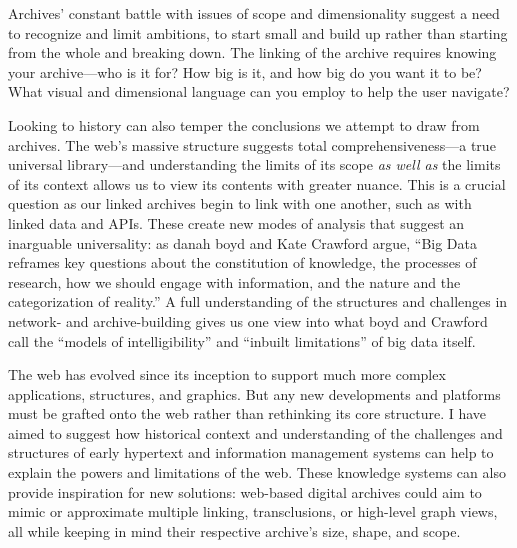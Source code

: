 Archives' constant battle with issues of scope and dimensionality suggest a need to recognize and limit ambitions, to start small and build up rather than starting from the whole and breaking down. The linking of the archive requires knowing your archive---who is it for? How big is it, and how big do you want it to be? What visual and dimensional language can you employ to help the user navigate?

Looking to history can also temper the conclusions we attempt to draw from archives. The web's massive structure suggests total comprehensiveness---a true universal library---and understanding the limits of its scope \emph{as well as} the limits of its context allows us to view its contents with greater nuance. This is a crucial question as our linked archives begin to link with one another, such as with linked data and APIs. These create new modes of analysis that suggest an inarguable universality: as danah boyd and Kate Crawford argue, ``Big Data reframes key questions about the constitution of knowledge, the processes of research, how we should engage with information, and the nature and the categorization of reality.''\autocite{boyd_critical_2012} A full understanding of the structures and challenges in network- and archive-building gives us one view into what boyd and Crawford call the ``models of intelligibility'' and ``inbuilt limitations'' of big data itself.

The web has evolved since its inception to support much more complex applications, structures, and graphics. But any new developments and platforms must be grafted onto the web rather than rethinking its core structure. I have aimed to suggest how historical context and understanding of the challenges and structures of early hypertext and information management systems can help to explain the powers and limitations of the web. These knowledge systems can also provide inspiration for new solutions: web-based digital archives could aim to mimic or approximate multiple linking, transclusions, or high-level graph views, all while keeping in mind their respective archive's size, shape, and scope.
